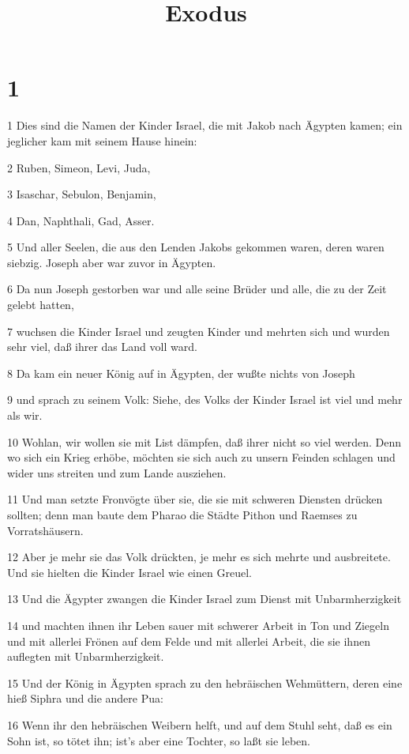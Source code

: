 

\title{Exodus}


\chapter{1}

\par 1 Dies sind die Namen der Kinder Israel, die mit Jakob nach Ägypten kamen; ein jeglicher kam mit seinem Hause hinein:
\par 2 Ruben, Simeon, Levi, Juda,
\par 3 Isaschar, Sebulon, Benjamin,
\par 4 Dan, Naphthali, Gad, Asser.
\par 5 Und aller Seelen, die aus den Lenden Jakobs gekommen waren, deren waren siebzig. Joseph aber war zuvor in Ägypten.
\par 6 Da nun Joseph gestorben war und alle seine Brüder und alle, die zu der Zeit gelebt hatten,
\par 7 wuchsen die Kinder Israel und zeugten Kinder und mehrten sich und wurden sehr viel, daß ihrer das Land voll ward.
\par 8 Da kam ein neuer König auf in Ägypten, der wußte nichts von Joseph
\par 9 und sprach zu seinem Volk: Siehe, des Volks der Kinder Israel ist viel und mehr als wir.
\par 10 Wohlan, wir wollen sie mit List dämpfen, daß ihrer nicht so viel werden. Denn wo sich ein Krieg erhöbe, möchten sie sich auch zu unsern Feinden schlagen und wider uns streiten und zum Lande ausziehen.
\par 11 Und man setzte Fronvögte über sie, die sie mit schweren Diensten drücken sollten; denn man baute dem Pharao die Städte Pithon und Raemses zu Vorratshäusern.
\par 12 Aber je mehr sie das Volk drückten, je mehr es sich mehrte und ausbreitete. Und sie hielten die Kinder Israel wie einen Greuel.
\par 13 Und die Ägypter zwangen die Kinder Israel zum Dienst mit Unbarmherzigkeit
\par 14 und machten ihnen ihr Leben sauer mit schwerer Arbeit in Ton und Ziegeln und mit allerlei Frönen auf dem Felde und mit allerlei Arbeit, die sie ihnen auflegten mit Unbarmherzigkeit.
\par 15 Und der König in Ägypten sprach zu den hebräischen Wehmüttern, deren eine hieß Siphra und die andere Pua:
\par 16 Wenn ihr den hebräischen Weibern helft, und auf dem Stuhl seht, daß es ein Sohn ist, so tötet ihn; ist's aber eine Tochter, so laßt sie leben.
